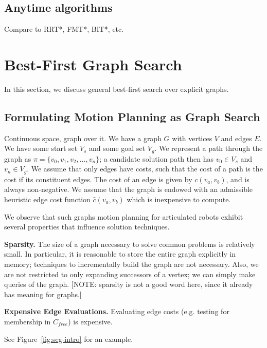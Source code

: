 \documentclass{report}
\begin{document}
\subsection{Anytime algorithms}

Compare to RRT*, FMT*, BIT*, etc.

\section{Best-First Graph Search}
\label{sec:best-first}

In this section,
we discuss general best-first search over explicit graphs.

\subsection{Formulating Motion Planning as Graph Search}

Continuous space, graph over it.
We have a graph $G$ with vertices $V$ and edges $E$.
We have some start set $V_s$ and some goal set $V_g$.
We represent a path through the graph as
$\pi = \{ v_0, v_1, v_2, \dots, v_n \}$;
a candidate solution path then has $v_0 \in V_s$ and $v_n \in V_g$.
We assume that only edges have costs,
such that the cost of a path is the cost if its constituent edges.
The cost of an edge is given by $c(v_a,v_b)$, and is always non-negative.
We assume that the graph is endowed with an admissible heuristic edge cost
function
$\hat{c}(v_a,v_b)$
which is inexpensive to compute.

We observe that such graphs motion planning for articulated robots
exhibit several properties that influence solution techniques.

\textbf{Sparsity.}
The size of a graph necessary to solve common problems
is relatively small.
In particular, it is reasonable to store the entire graph explicitly in
memory;
techniques to incrementally build the graph
are not necessary.
Also,
we are not restricted to only expanding successors of a vertex;
we can simply make queries of the graph.
[NOTE: sparsity is not a good word here, since it already has meaning
for graphs.]

\textbf{Expensive Edge Evaluations.}
Evaluating edge costs (e.g. testing for membership in $C_{free}$)
is expensive.

See Figure~\ref{fig:seg-intro} for an example.
\end{document}
